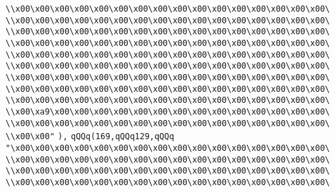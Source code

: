 \verb|\\x00\x00\x00\x00\x00\x00\x00\x00\x00\x00\x00\x00\x00\x00\x00\x00\|\newline
\verb|\\x00\x00\x00\x00\x00\x00\x00\x00\x00\x00\x00\x00\x00\x00\x00\x00\|\newline
\verb|\\x00\x00\x00\x00\x00\x00\x00\x00\x00\x00\x00\x00\x00\x00\x00\x00\|\newline
\verb|\\x00\x00\x00\x00\x00\x00\x00\x00\x00\x00\x00\x00\x00\x00\x00\x00\|\newline
\verb|\\x00\x00\x00\x00\x00\x00\x00\x00\x00\x00\x00\x00\x00\x00\x00\x00\|\newline
\verb|\\x00\x00\x00\x00\x00\x00\x00\x00\x00\x00\x00\x00\x00\x00\x00\x00\|\newline
\verb|\\x00\x00\x00\x00\x00\x00\x00\x00\x00\x00\x00\x00\x00\x00\x00\x00\|\newline
\verb|\\x00\x00\x00\x00\x00\x00\x00\x00\x00\x00\x00\x00\x00\x00\x00\x00\|\newline
\verb|\\x00\x00\x00\x00\x00\x00\x00\x00\x00\x00\x00\x00\x00\x00\x00\x00\|\newline
\verb|\\x00\xa9\x00\x00\x00\x00\x00\x00\x00\x00\x00\x00\x00\x00\x00\x00\|\newline
\verb|\\x00\x00\x00\x00\x00\x00\x00\x00\x00\x00\x00\x00\x00\x00\x00\x00\|\newline
\verb|\\x00\x00"|\newline
\verb|),|\newline
\verb|qQQq(169,qQQq129,qQQq|\newline
\verb|"\x00\x00\x00\x00\x00\x00\x00\x00\x00\x00\x00\x00\x00\x00\x00\x00\|\newline
\verb|\\x00\x00\x00\x00\x00\x00\x00\x00\x00\x00\x00\x00\x00\x00\x00\x00\|\newline
\verb|\\x00\x00\x00\x00\x00\x00\x00\x00\x00\x00\x00\x00\x00\x00\x00\x00\|\newline
\verb|\\x00\x00\x00\x00\x00\x00\x00\x00\x00\x00\x00\x00\x00\x00\x00\x00\|\newline
